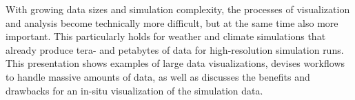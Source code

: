 \license


With growing data sizes and simulation complexity, the processes of visualization and analysis become technically more difficult, but at the same time also more important. This particularly holds for weather and climate simulations that already produce tera- and petabytes of data for high-resolution simulation runs. This presentation shows examples of large data visualizations, devises workflows to handle massive amounts of data, as well as discusses the benefits and drawbacks for an in-situ visualization of the simulation data.

